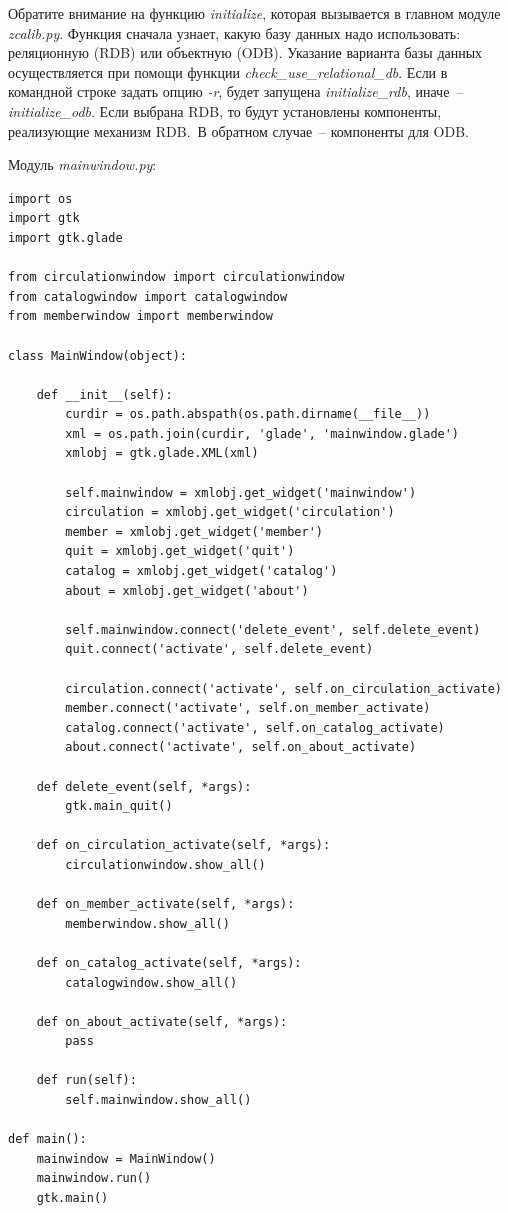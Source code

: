 \documentclass[a4paper,openany,twoside,final]{book}
\providecommand*{\DUroletitlereference}[1]{\textsl{#1}}
\begin{document}
Обратите внимание на функцию \DUroletitlereference{initialize}, которая вызывается в главном модуле \DUroletitlereference{zcalib.py}.  Функция сначала узнает, какую базу данных надо использовать: реляционную (RDB) или объектную (ODB).  Указание варианта базы данных осуществляется при помощи функции \DUroletitlereference{check\_use\_relational\_db}.  Если в командной строке задать опцию \DUroletitlereference{-r}, будет запущена \DUroletitlereference{initialize\_rdb}, иначе~-- \DUroletitlereference{initialize\_odb}.  Если выбрана RDB, то будут установлены компоненты, реализующие механизм RDB.~В обратном случае~-- компоненты для ODB.

Модуль \DUroletitlereference{mainwindow.py}:

\begin{verbatim}
import os
import gtk
import gtk.glade

from circulationwindow import circulationwindow
from catalogwindow import catalogwindow
from memberwindow import memberwindow

class MainWindow(object):

    def __init__(self):
        curdir = os.path.abspath(os.path.dirname(__file__))
        xml = os.path.join(curdir, 'glade', 'mainwindow.glade')
        xmlobj = gtk.glade.XML(xml)

        self.mainwindow = xmlobj.get_widget('mainwindow')
        circulation = xmlobj.get_widget('circulation')
        member = xmlobj.get_widget('member')
        quit = xmlobj.get_widget('quit')
        catalog = xmlobj.get_widget('catalog')
        about = xmlobj.get_widget('about')

        self.mainwindow.connect('delete_event', self.delete_event)
        quit.connect('activate', self.delete_event)

        circulation.connect('activate', self.on_circulation_activate)
        member.connect('activate', self.on_member_activate)
        catalog.connect('activate', self.on_catalog_activate)
        about.connect('activate', self.on_about_activate)

    def delete_event(self, *args):
        gtk.main_quit()

    def on_circulation_activate(self, *args):
        circulationwindow.show_all()

    def on_member_activate(self, *args):
        memberwindow.show_all()

    def on_catalog_activate(self, *args):
        catalogwindow.show_all()

    def on_about_activate(self, *args):
        pass

    def run(self):
        self.mainwindow.show_all()

def main():
    mainwindow = MainWindow()
    mainwindow.run()
    gtk.main()
\end{verbatim}
\end{document}
